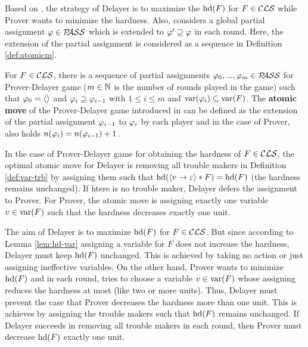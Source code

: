 \documentclass{report}
\begin{document}
Based on \cite{BeyersdorffKullmann2014PHP}, the strategy of Delayer is to maximize the $\operatorname{hd}(F)$ for $F \in \mathcal{CLS}$ while Prover wants to minimize the hardness. Also, \cite{BeyersdorffKullmann2014PHP} considers a global partial assignment $\varphi \in \mathcal{P\hspace{-0.32em}ASS}$ which is extended to $\varphi' \supseteq \varphi$ in each round. Here, the extension of the partial assignment is considered as a sequence in Definition \ref{def:atomicm}.

\begin{defi}\label{def:atomicm}
For $F \in \mathcal{CLS}$, there is a sequence of partial assignments $\varphi_0, ..., \varphi_m \in \mathcal{P\hspace{-0.32em}ASS}$ for Prover-Delayer game ($m \in \mathbb{N}$ is the number of rounds played in the game) such that $\varphi_0=\langle  \rangle$ and $\varphi_i \supseteq \varphi_{i-1}$ with $1 \le i \le m$ and $\operatorname{var}(\varphi_i) \subseteq \operatorname{var}(F)$. The \textbf{atomic move} of the Prover-Delayer game introduced in \cite{BeyersdorffKullmann2014PHP} can be defined as the extension of the partial assignment $\varphi_{i-1} $ to $\varphi_{i}$ by each player and in the case of Prover, also holds $n(\varphi_i)=n( \varphi_{i-1})+1$.
\end{defi}

\begin{lem}\label{lem:atm-m-D-P}
In the case of Prover-Delayer game for obtaining the hardness of $F \in \mathcal{CLS}$, the optimal atomic move for Delayer is removing all trouble makers in Definition \ref{def:var-trb} by assigning them such that $\operatorname{hd}(\langle v \rightarrow \varepsilon \rangle*F)=\operatorname{hd}(F)$ (the hardness remains unchanged). If htere is no trouble maker, Delayer defers the assignment to Prover. For Prover, the atomic move is assigning exactly one variable $v \in \operatorname{var}(F)$ such that the hardness decreases exactly one unit.
\end{lem}
\begin{prf}
The aim of Delayer is to maximize $\operatorname{hd}(F)$ for $F \in \mathcal{CLS}$. But since according to Lemma \ref{lem:hd-var} assigning a variable for $F$ does not increase the hardness, Delayer must keep $\operatorname{hd}(F)$ unchanged. This is achieved by taking no action or just assigning  ineffective variables. On the other hand, Prover wants to minimize $\operatorname{hd}(F)$ and in each round, tries to choose a variable $v \in \operatorname{var}(F)$ whose assigning reduces the hardness at most (like two or more units). Thus, Delayer must prevent the case that Prover decreases the hardness more than one unit. This is achieves by assigning the trouble makers such that $\operatorname{hd}(F)$ remains unchanged. If Delayer succeeds in removing all trouble makers in each round, then Prover must decrease $\operatorname{hd}(F)$ exactly one unit.
\end{prf}
\end{document}
